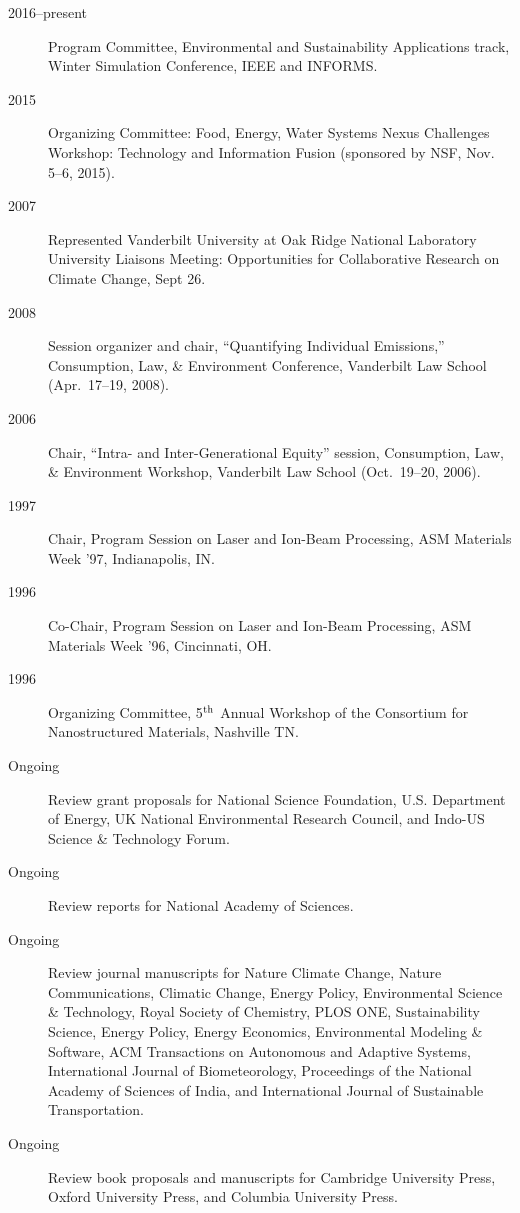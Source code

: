 \documentclass[10pt]{article}
\begin{document}
\begin{description}
            \item[2016--present] Program Committee, Environmental and Sustainability Applications track, Winter Simulation Conference, IEEE and INFORMS.
    	    \item[2015] Organizing Committee: Food, Energy, Water Systems Nexus Challenges Workshop: Technology and Information Fusion (sponsored by NSF, Nov. 5--6, 2015).
    		\item[2007] Represented Vanderbilt University at Oak Ridge National Laboratory University Liaisons Meeting: Opportunities for Collaborative Research on Climate Change, Sept 26.
    		\item[2008] Session organizer and chair, ``Quantifying Individual Emissions,'' Consumption, Law, \& Environment Conference, Vanderbilt Law School (Apr.\ 17--19, 2008).
    		\item[2006] Chair, ``Intra- and Inter-Generational Equity'' session, Consumption, Law, \& Environment Workshop, Vanderbilt Law School (Oct.~19--20, 2006).
    		\item[1997] Chair, Program Session on Laser and Ion-Beam Processing, ASM Materials Week '97, In\-di\-an\-a\-po\-lis, IN.
    		\item[1996] Co-Chair, Program Session on Laser and Ion-Beam Processing, ASM Materials Week '96, Cincinnati, OH.
    		\item[1996] Organizing Committee, 5$^{\mbox{\scriptsize th}}$ Annual Workshop of the Consortium for Nanostructured Materials, Nashville TN.
    		\item[Ongoing] Review grant proposals for National Science Foundation, U.S. Department of Energy, UK National Environmental Research Council, and Indo-US Science \& Technology Forum.
            \item[Ongoing] Review reports for National Academy of Sciences.
    		\item[Ongoing] Review journal manuscripts for
                Nature Climate Change,
                Nature Communications,
                Climatic Change,
                Energy Policy,
                Environmental Science \& Technology,
                Royal Society of Chemistry,
                PLOS ONE,
                Sustainability Science,
                Energy Policy,
                Energy Economics,
                Environmental Modeling \& Software,
                ACM Transactions on Autonomous and Adaptive Systems,
                International Journal of Biometeorology,
                Proceedings of the National Academy of Sciences of India,
                and
                International Journal of Sustainable Transportation.
    		\item[Ongoing] Review book proposals and manuscripts for Cambridge University Press, Oxford University Press, and Columbia University Press.
        \end{description}
\end{document}
